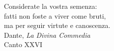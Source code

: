 \thispagestyle{empty}
\begin{flushright}

\vspace*{60mm}

Considerate la vostra semenza:\\
fatti non foste a viver come bruti,\\
ma per seguir virtute e canoscenza.\\
\vspace{4mm}
Dante, \textit{La Divina Commedia}\\
Canto XXVI




\end{flushright}
